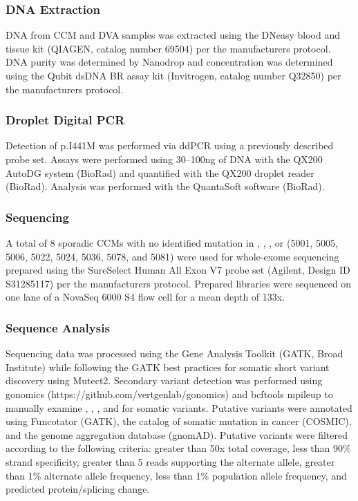 \subsubsection{DNA Extraction}
	DNA from CCM and DVA samples was extracted using the DNeasy blood and tissue kit (QIAGEN, catalog number 69504) per the manufacturers protocol. DNA purity was determined by Nanodrop and concentration was determined using the Qubit dsDNA BR assay kit (Invitrogen, catalog number Q32850) per the manufacturers protocol. 

\subsubsection{Droplet Digital PCR}
Detection of  p.I441M was performed via ddPCR using a previously described probe set\citep{couto2015}. Assays were performed using 30--100ng of DNA with the QX200 AutoDG system (BioRad) and quantified with the QX200 droplet reader (BioRad). Analysis was performed with the QuantaSoft software (BioRad). 

\subsubsection{Sequencing}
	A total of 8 sporadic CCMs with no identified mutation in , , , or  (5001, 5005, 5006, 5022, 5024, 5036, 5078, and 5081) were used for whole-exome sequencing prepared using the SureSelect Human All Exon V7 probe set (Agilent, Design ID S31285117) per the manufacturers protocol. Prepared libraries were sequenced on one lane of a NovaSeq 6000 S4 flow cell for a mean depth of 133x. 

\subsubsection{Sequence Analysis}
	Sequencing data was processed using the Gene Analysis Toolkit (GATK, Broad Institute) while following the GATK best practices for somatic short variant discovery using Mutect2. Secondary variant detection was performed using gonomics (https://github.com/vertgenlab/gonomics) and bcftools mpileup to manually examine , , , and  for somatic variants. Putative variants were annotated using Funcotator (GATK), the catalog of somatic mutation in cancer (COSMIC), and the genome aggregation database (gnomAD). Putative variants were filtered according to the following criteria: greater than 50x total coverage, less than 90\% strand specificity, greater than 5 reads supporting the alternate allele, greater than 1\% alternate allele frequency, less than 1\% population allele frequency, and predicted protein/splicing change. 

